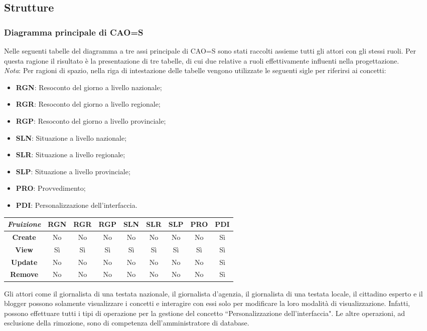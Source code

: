 \subsection{Strutture}
\label{ss:strutture}
\subsubsection{Diagramma principale di CAO=S}
\label{sss:diagramma-principale-caos}
Nelle seguenti tabelle del diagramma a tre assi principale di CAO=S sono stati raccolti assieme tutti gli attori con gli stessi ruoli.
Per questa ragione il risultato è la presentazione di tre tabelle, di cui due relative a ruoli effettivamente influenti nella progettazione.\\
\textit{Nota}: Per ragioni di spazio, nella riga di intestazione delle tabelle vengono utilizzate le seguenti sigle per riferirsi ai concetti:
\begin{itemize}
    \item \textbf{RGN}: Resoconto del giorno a livello nazionale;
    \item \textbf{RGR}: Resoconto del giorno a livello regionale;
    \item \textbf{RGP}: Resoconto del giorno a livello provinciale;
    \item \textbf{SLN}: Situazione a livello nazionale;
    \item \textbf{SLR}: Situazione a livello regionale;
    \item \textbf{SLP}: Situazione a livello provinciale;
    \item \textbf{PRO}: Provvedimento;
    \item \textbf{PDI}: Personalizzazione dell'interfaccia.
\end{itemize}

{
\renewcommand{\arraystretch}{2}
\begin{longtable}[h]{| c | c | c | c | c | c | c | c | c |}
    \hline
    \textit{Fruizione} & \textbf{RGN} & \textbf{RGR} & \textbf{RGP} & \textbf{SLN} & \textbf{SLR} & \textbf{SLP} & \textbf{PRO} & \textbf{PDI} \\
    \hline
    \endhead
    \textbf{Create} & No & No & No & No & No & No & No & Sì \\
    \hline
    \textbf{View}   & Sì & Sì & Sì & Sì & Sì & Sì & Sì & Sì \\
    \hline
    \textbf{Update} & No & No & No & No & No & No & No & Sì \\
    \hline
    \textbf{Remove} & No & No & No & No & No & No & No & Sì \\
    \hline
\end{longtable}
}
\noindent
Gli attori come il giornalista di una testata nazionale, il giornalista d'agenzia, il giornalista di una testata locale, il cittadino esperto e il blogger possono solamente visualizzare i concetti e interagire con essi solo per modificare la loro modalità di visualizzazione.
Infatti, possono effettuare tutti i tipi di operazione per la gestione del concetto ``Personalizzazione dell'interfaccia".
Le altre operazioni, ad esclusione della rimozione, sono di competenza dell'amministratore di database.

